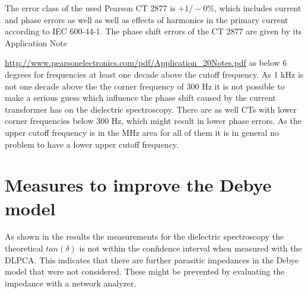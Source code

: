 The error class of the used Pearson CT 2877 is $+1 / -0 \% $, which includes current and phase errors as well as well as effects of harmonics in the primary current according to IEC 600-44-1. The phase shift errors of the CT 2877 are given by its Application Note {\url{http://www.pearsonelectronics.com/pdf/Application_20Notes.pdf} as below 6 degrees for frequencies at least one decade above the cutoff frequency. As 1 kHz is not one decade above the the corner frequency of 300 Hz it is not possible to make a serious guess which influence the phase shift caused by the current transformer has on the dielectric spectroscopy. There are as well CTs with lower corner frequencies below 300 Hz, which might result in lower phase errors. As the upper cutoff frequency is in the MHz area for all of them it is in general no problem to have a lower upper cutoff frequency. 

\section{Measures to improve the Debye model}
\label{debyemodel}
As shown in the results the measurements for the dielectric spectroscopy the theoretical $tan(\delta)$ is not within the confidence interval when measured with the DLPCA. This indicates that there are further parasitic impedances in the Debye model that were not considered. These might be prevented by evaluating the impedance with a network analyzer. 


}
